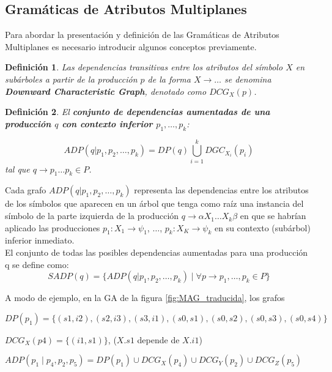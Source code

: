 \documentclass[a4paper]{article}
\newtheorem{definition}{Definición}[section]
\begin{document}
\subsection{Gramáticas de Atributos Multiplanes}
\label{def:MAG}

Para abordar la presentación y definición de las Gramáticas de Atributos Multiplanes es necesario introducir algunos conceptos previamente.

\begin{definition}
Las dependencias transitivas entre los atributos del símbolo $X$ 
en subárboles a partir de la producción $p$ de la forma $X \rightarrow \ldots$ se denomina 
\textbf{Downward Characteristic Graph}, denotado como $DCG_X(p)$.
\end{definition}

\begin{definition}
El \textbf{conjunto de dependencias aumentadas de una producción $q$ con contexto inferior
$p_1, \ldots, p_k$}:

$$
ADP (q | p_{1}, p_{2}, \dots, p_{k}) = DP(q) \bigcup_{i=1}^k DGC_{X_i} (p_{i})
$$
tal que $q \rightarrow p_1 \ldots p_k \in P$.
\end{definition}

Cada grafo $ADP (q | p_1, p_2, \dots, p_k)$ representa las dependencias entre los atributos
de los símbolos que aparecen en un árbol que tenga como raíz una instancia del símbolo de la
parte izquierda de la producción $q \rightarrow \alpha X_1 \ldots X_k \beta$
en que se habrían aplicado las producciones $p_1: X_1 \rightarrow \psi_1$, $\ldots$,
$p_k: X_K \rightarrow \psi_k$ en su contexto (subárbol) inferior inmediato. \\

El conjunto de todas las posibles dependencias aumentadas para una producción q se define como:
$$ SADP(q) = \{ ADP (q | p_{1}, p_{2}, \dots, p_{k}) \mid \forall 
p \rightarrow p_1, \ldots, p_k \in P \} $$

A modo de ejemplo, en la GA de la figura \ref{fig:MAG_traducida}, los grafos

\begin{center}
\small
$DP(p_1) = \{(s1,i2),(s2,i3),(s3,i1),(s0,s1),(s0,s2),(s0,s3),(s0,s4)\}$

$DCG_X(p4) = \{(i1,s1)\}$, ($X.s1$ depende de $X.i1$)

$ADP(p_1 \mid p_4, p_2, p_5) = DP(p_1) \cup DCG_X(p_4) \cup DCG_Y(p_2) \cup DCG_Z(p_5)$
\normalsize
\end{center}
\end{document}
